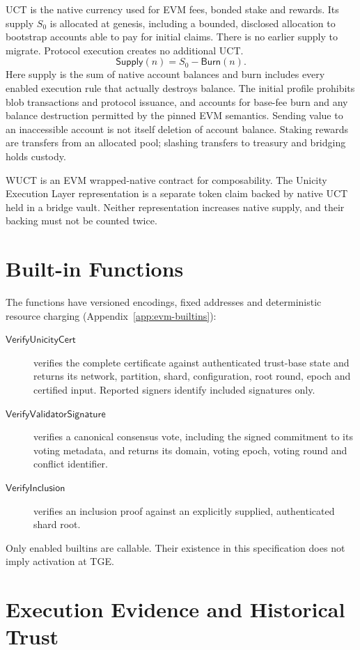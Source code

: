 UCT is the native currency used for EVM fees, bonded stake and rewards. Its supply $S_0$ is allocated at genesis, including a bounded, disclosed allocation to bootstrap accounts able to pay for initial claims. There is no earlier supply to migrate. Protocol execution creates no additional UCT.
\[
 \mathsf{Supply}(n)=S_0-\mathsf{Burn}(n).
\]
Here supply is the sum of native account balances and burn includes every enabled execution rule that actually destroys balance. The initial profile prohibits blob transactions and protocol issuance, and accounts for base-fee burn and any balance destruction permitted by the pinned EVM semantics. Sending value to an inaccessible account is not itself deletion of account balance. Staking rewards are transfers from an allocated pool; slashing transfers to treasury and bridging holds custody.

WUCT is an EVM wrapped-native contract for composability. The Unicity Execution Layer representation is a separate token claim backed by native UCT held in a bridge vault. Neither representation increases native supply, and their backing must not be counted twice.

\section{Built-in Functions}\label{sec:evm-builtins}

The functions have versioned encodings, fixed addresses and deterministic resource charging (Appendix~\ref{app:evm-builtins}):
\begin{description}
 \item[$\mathsf{VerifyUnicityCert}$] verifies the complete certificate against authenticated trust-base state and returns its network, partition, shard, configuration, root round, epoch and certified input. Reported signers identify included signatures only.
 \item[$\mathsf{VerifyValidatorSignature}$] verifies a canonical consensus vote, including the signed commitment to its voting metadata, and returns its domain, voting epoch, voting round and conflict identifier.
 \item[$\mathsf{VerifyInclusion}$] verifies an inclusion proof against an explicitly supplied, authenticated shard root.
\end{description}
Only enabled builtins are callable. Their existence in this specification does not imply activation at TGE.

\section{Execution Evidence and Historical Trust}\label{sec:evm-evidence}


